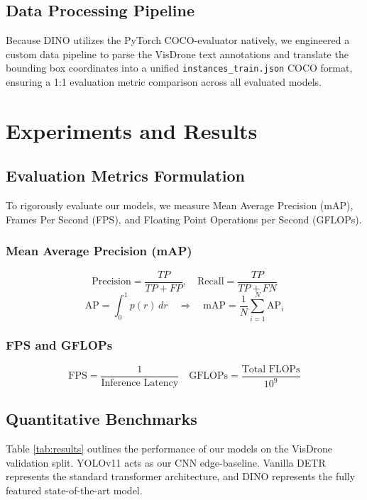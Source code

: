\documentclass[11pt, conference, onecolumn]{IEEEtran}
\begin{document}
\subsection{Data Processing Pipeline}
Because DINO utilizes the PyTorch COCO-evaluator natively, we engineered a custom data pipeline to parse the VisDrone text annotations and translate the bounding box coordinates into a unified \texttt{instances\_train.json} COCO format, ensuring a 1:1 evaluation metric comparison across all evaluated models.
\section{Experiments and Results}

\subsection{Evaluation Metrics Formulation}
To rigorously evaluate our models, we measure Mean Average Precision (mAP), Frames Per Second (FPS), and Floating Point Operations per Second (GFLOPs).

\subsubsection{Mean Average Precision (mAP)}
$$ \text{Precision} = \frac{TP}{TP + FP}, \quad \text{Recall} = \frac{TP}{TP + FN} $$
$$ \text{AP} = \int_{0}^{1} p(r) \, dr \quad \Rightarrow \quad \text{mAP} = \frac{1}{N} \sum_{i=1}^{N} \text{AP}_i $$

\subsubsection{FPS and GFLOPs}
$$ \text{FPS} = \frac{1}{\text{Inference Latency}} \quad \text{GFLOPs} = \frac{\text{Total FLOPs}}{10^9} $$

\subsection{Quantitative Benchmarks}
Table \ref{tab:results} outlines the performance of our models on the VisDrone validation split. YOLOv11 acts as our CNN edge-baseline. Vanilla DETR represents the standard transformer architecture, and DINO represents the fully featured state-of-the-art model.
\end{document}
